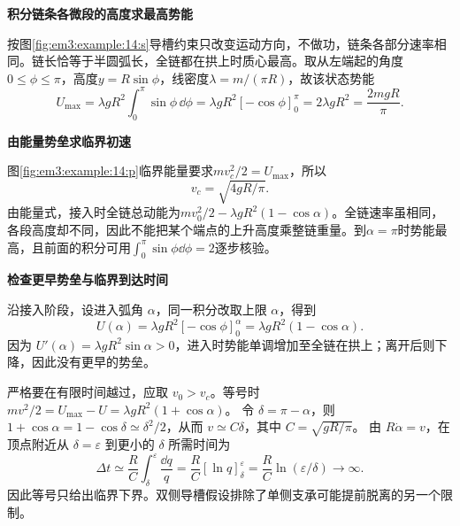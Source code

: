 \begin{solution}\textbf{积分链条各微段的高度求最高势能}\par\nobreak
按图\ref{fig:em3:example:14:s}导槽约束只改变运动方向，不做功，链条各部分速率相同。链长恰等于半圆弧长，全链都在拱上时质心最高。取从左端起的角度$0\le\phi\le\pi$，高度$y=R\sin\phi$，线密度$\lambda=m/(\pi R)$，故该状态势能
\[
U_{\max}=\lambda gR^2\int_0^\pi\sin\phi\,\dd\phi
=\lambda gR^2[-\cos\phi]_0^\pi
=2\lambda gR^2=\frac{2mgR}{\pi}.
\]



\par\medskip{}\noindent\textbf{由能量势垒求临界初速}\par\nobreak
图\ref{fig:em3:example:14:p}临界能量要求$mv_c^2/2=U_{\max}$，所以
\[\boxed{v_c=\sqrt{4gR/\pi}}.\]
由能量式，接入时全链总动能为$mv_0^2/2-\lambda gR^2(1-\cos\alpha)$。全链速率虽相同，各段高度却不同，因此不能把某个端点的上升高度乘整链重量。到$\alpha=\pi$时势能最高，且前面的积分可用$\int_0^\pi\sin\phi\dd\phi=2$逐步核验。



\par\medskip{}\noindent\textbf{检查更早势垒与临界到达时间}\par\nobreak
沿接入阶段，设进入弧角 $\alpha$，同一积分改取上限 $\alpha$，得到
\[
U(\alpha)=\lambda gR^2[-\cos\phi]_0^\alpha
=\lambda gR^2(1-\cos\alpha).
\]
因为 $U'(\alpha)=\lambda gR^2\sin\alpha>0$，进入时势能单调增加至全链在拱上；离开后则下降，因此没有更早的势垒。

严格要在有限时间越过，应取 $v_0>v_c$。等号时
$mv^2/2=U_{\max}-U=\lambda gR^2(1+\cos\alpha)$。
令 $\delta=\pi-\alpha$，则 $1+\cos\alpha=1-\cos\delta\simeq\delta^2/2$，从而
$v\simeq C\delta$，其中 $C=\sqrt{gR/\pi}$。
由 $R\dot\alpha=v$，在顶点附近从 $\delta=\varepsilon$ 到更小的 $\delta$ 所需时间为
\[
\Delta t\simeq\frac RC\int_\delta^\varepsilon\frac{\dd q}{q}
=\frac RC[\ln q]_\delta^\varepsilon
=\frac RC\ln(\varepsilon/\delta)\longrightarrow\infty.
\]
因此等号只给出临界下界。双侧导槽假设排除了单侧支承可能提前脱离的另一个限制。\end{solution}
